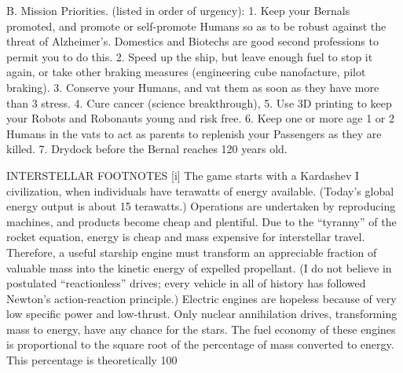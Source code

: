 \documentclass[a4paper]{book}
\begin{document}
B. Mission Priorities. (listed in order of urgency):
1.     Keep your Bernals promoted, and promote or self-promote Humans so as to be robust against the threat of Alzheimer’s. Domestics and Biotechs are good second professions to permit you to do this.
2.     Speed up the ship, but leave enough fuel to stop it again, or take other braking measures (engineering cube nanofacture, pilot braking).
3.     Conserve your Humans, and vat them as soon as they have more than 3 stress.
4.     Cure cancer (science breakthrough),
5.     Use 3D printing to keep your Robots and Robonauts young and risk free.
6.     Keep one or more age 1 or 2 Humans in the vats to act as parents to replenish your Passengers as they are killed.
7.     Drydock before the Bernal reaches 120 years old.

INTERSTELLAR FOOTNOTES
[i] The game starts with a Kardashev I civilization, when individuals have terawatts of energy available. (Today’s global energy output is about 15 terawatts.) Operations are undertaken by reproducing machines, and products become cheap and plentiful. Due to the “tyranny” of the rocket equation, energy is cheap and mass expensive for interstellar travel. Therefore, a useful starship engine must transform an appreciable fraction of valuable mass into the kinetic energy of expelled propellant. (I do not believe in postulated “reactionless” drives; every vehicle in all of history has followed Newton’s action-reaction principle.) Electric engines are hopeless because of very low specific power and low-thrust. Only nuclear annihilation drives, transforming mass to energy, have any chance for the stars. The fuel economy of these engines is proportional to the square root of the percentage of mass converted to energy. This percentage is theoretically 100%
 
\end{document}
